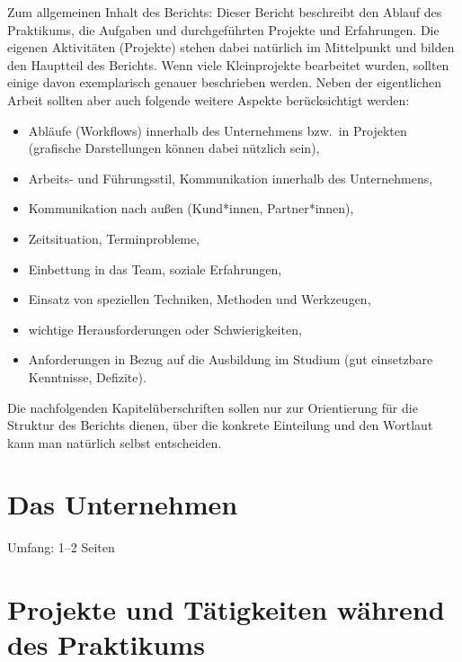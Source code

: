 \documentclass[type=internship,theme=default,language=german,smartquotes]{hgbthesis}
\begin{document}
Zum allgemeinen Inhalt des Berichts: Dieser Bericht beschreibt den Ablauf des
Praktikums, die Aufgaben und durchgeführten Projekte und Erfahrungen. Die
eigenen Aktivitäten (Projekte) stehen dabei natürlich im Mittelpunkt und bilden
den Hauptteil des Berichts. Wenn viele Kleinprojekte bearbeitet wurden, sollten
einige davon exemplarisch genauer beschrieben werden. Neben der eigentlichen
Arbeit sollten aber auch folgende weitere Aspekte berücksichtigt werden:
%
\begin{itemize}
	\item Abläufe (Workflows) innerhalb des Unternehmens bzw.\ in Projekten
	(grafische Darstellungen können dabei nützlich sein),
	\item Arbeits- und Führungsstil, Kommunikation innerhalb des Unternehmens,
	\item Kommunikation nach außen (Kund*innen, Partner*innen),
	\item Zeitsituation, Terminprobleme,
	\item Einbettung in das Team, soziale Erfahrungen,
	\item Einsatz von speziellen Techniken, Methoden und Werkzeugen,
	\item wichtige Herausforderungen oder Schwierigkeiten,
	\item Anforderungen in Bezug auf die Ausbildung im Studium (gut
	einsetzbare Kenntnisse, Defizite).
\end{itemize}
%
Die nachfolgenden Kapitelüberschriften sollen nur zur Orientierung für die
Struktur des Berichts dienen, über die konkrete Einteilung und den Wortlaut
kann man natürlich selbst entscheiden.

\mainmatter                             %

\chapter{Das Unternehmen}

Umfang: 1--2 Seiten


\chapter{Projekte und Tätigkeiten während des Praktikums}
\end{document}
